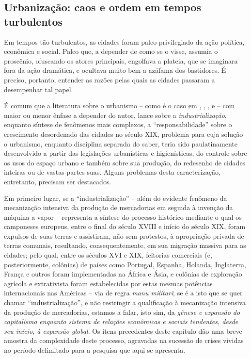 \subsection{Urbanização: caos e ordem em tempos turbulentos}\label{subsec:urbanizacaos}

Em tempos tão turbulentos, as cidades foram palco privilegiado da ação política, econômica e social. Palco que, a depender de como se o visse, assumia o proscênio, ofuscando os atores principais, engolfava a plateia, que se imaginara fora da ação dramática, e ocultava muito bem a azáfama dos bastidores. É preciso, portanto, entender as razões pelas quais as cidades passaram a desempenhar tal papel.

É comum que a literatura sobre o urbanismo -- como é o caso em , , ,  e  -- com maior ou menor ênfase a depender do autor, lance sobre a \textit{industrialização}, enquanto síntese de fenômenos mais complexos, a ``responsabilidade'' sobre o crescimento desordenado das cidades no século XIX, problema para cuja solução o urbanismo, enquanto disciplina separada do saber, teria sido paulatinamente desenvolvido a partir das legislações urbanísticas e higienísticas, do controle sobre os usos do espaço urbano e também sobre sua produção, do redesenho de cidades inteiras ou de vastas partes suas. Alguns problemas desta caracterização, entretanto, precisam ser destacados.

Em primeiro lugar, se a ``industrialização'' -- além do evidente fenômeno da mecanização intensiva da produção de mercadorias em seguida à invenção da máquina a vapor -- representa a síntese do processo histórico mediante o qual os camponeses europeus, entre o final do século XVIII e início do século XIX, foram expulsos de suas terras e assistiram, não sem protestos, à apropriação privada de terras comunais, resultando, consequentemente, em sua migração massiva para as cidades; pelo qual, entre os séculos XVI e XIX, feitorias comerciais (e, posteriormente, colônias) de países como Portugal, Espanha, Holanda, Inglaterra, França e outros foram implementadas na África e Ásia, e colônias de exploração agrícola e extrativista foram estabelecidas por estas mesmas potências internacionais nas Américas -- via de regra \textit{manu militari}; se é a isto que se quer chamar ``industrialização'', e não restringir a qualificação à mecanização intensiva da produção de mercadorias, estamos a falar, isto sim, da \textit{gênese e expansão do capitalismo enquanto sistema de relações econômicas e sociais tendentes, desde seu início, à expansão global}. Os itens precedentes deste capítulo dão uma breve amostra da complexidade deste processo, agravadas na sucessão de crises vividas no período delimitado para a pesquisa que aqui se apresenta.

